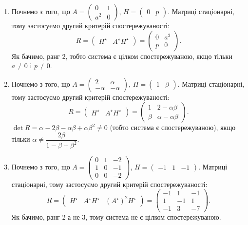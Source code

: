 \begin{solution}
    \begin{enumerate}
        \item Почнемо з того, що $A = \begin{pmatrix} 0 & 1 \\ a^2 & 0 \end{pmatrix}$, $H = \begin{pmatrix} 0 & p \end{pmatrix}$. Матриці стаціонарні, тому застосуємо другий критерій спостережуваності:
        \[ R = \begin{pmatrix} H^\star & A^\star H^\star \end{pmatrix} = \begin{pmatrix} 0 & a^2 \\ p & 0 \end{pmatrix}. \]
        Як бачимо, ранг 2, тобто система є цілком спостережуваною, якщо тільки $a \ne 0$ і $p \ne 0$.
        \item Почнемо з того, що $A = \begin{pmatrix} 2 & \alpha \\ -\alpha & -\alpha \end{pmatrix}$, $H = \begin{pmatrix} 1 & \beta \end{pmatrix}$. Матриці стаціонарні, тому застосуємо другий критерій спостережуваності:
        \[ R = \begin{pmatrix} H^\star & A^\star H^\star \end{pmatrix} = \begin{pmatrix} 1 & 2 - \alpha\beta \\ \beta & \alpha - \alpha\beta \end{pmatrix}. \]
        $\det R = \alpha - 2\beta - \alpha\beta + \alpha\beta^2 \ne 0$ (тобто система є спостережуваною), якщо тільки $\alpha \ne \dfrac{2\beta}{1-\beta+\beta^2}$.
        \item Почнемо з того, що $A = \begin{pmatrix} 0 & 1 & -2 \\ 1 & 0 & - 1 \\ 0 & 0 & -2 \end{pmatrix}$, $H = \begin{pmatrix} -1 & 1 & -1 \end{pmatrix}$. Матриці стаціонарні, тому застосуємо другий критерій спостережуваності:
        \[ R = \begin{pmatrix} H^\star & A^\star H^\star & (A^\star)^2 H^\star \end{pmatrix} = \begin{pmatrix} -1 & 1 & -1 \\ 1 & -1 & 1 \\ -1 & 3 & -7 \end{pmatrix}.\]
        Як бачимо, ранг 2 а не 3, тому система не є цілком спостережуваною.
    \end{enumerate}
\end{solution}

